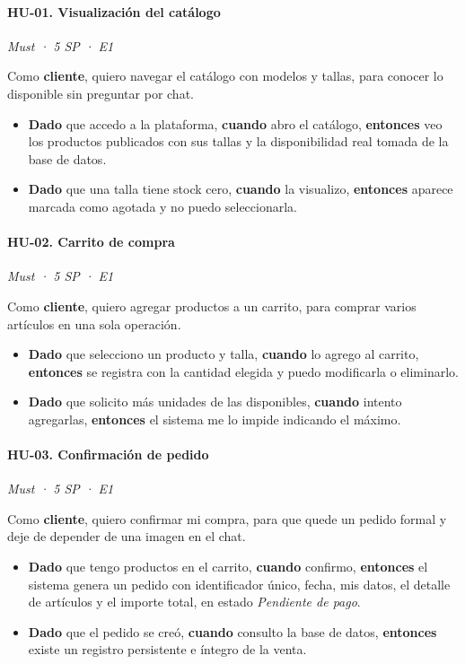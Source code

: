\documentclass[12pt, a4paper]{article}
\newcommand{\hutag}[3]{\textit{#1 · #2 · #3}\par\vspace{2pt}}
\begin{document}
\paragraph{HU-01. Visualización del catálogo}
\hutag{Must}{5 SP}{E1}
Como \textbf{cliente}, quiero navegar el catálogo con modelos y tallas, para conocer lo disponible sin preguntar por chat.
\begin{itemize}[leftmargin=*]
    \item \textbf{Dado} que accedo a la plataforma, \textbf{cuando} abro el catálogo, \textbf{entonces} veo los productos publicados con sus tallas y la disponibilidad real tomada de la base de datos.
    \item \textbf{Dado} que una talla tiene stock cero, \textbf{cuando} la visualizo, \textbf{entonces} aparece marcada como agotada y no puedo seleccionarla.
\end{itemize}

\paragraph{HU-02. Carrito de compra}
\hutag{Must}{5 SP}{E1}
Como \textbf{cliente}, quiero agregar productos a un carrito, para comprar varios artículos en una sola operación.
\begin{itemize}[leftmargin=*]
    \item \textbf{Dado} que selecciono un producto y talla, \textbf{cuando} lo agrego al carrito, \textbf{entonces} se registra con la cantidad elegida y puedo modificarla o eliminarlo.
    \item \textbf{Dado} que solicito más unidades de las disponibles, \textbf{cuando} intento agregarlas, \textbf{entonces} el sistema me lo impide indicando el máximo.
\end{itemize}

\paragraph{HU-03. Confirmación de pedido}
\hutag{Must}{5 SP}{E1}
Como \textbf{cliente}, quiero confirmar mi compra, para que quede un pedido formal y deje de depender de una imagen en el chat.
\begin{itemize}[leftmargin=*]
    \item \textbf{Dado} que tengo productos en el carrito, \textbf{cuando} confirmo, \textbf{entonces} el sistema genera un pedido con identificador único, fecha, mis datos, el detalle de artículos y el importe total, en estado \textit{Pendiente de pago}.
    \item \textbf{Dado} que el pedido se creó, \textbf{cuando} consulto la base de datos, \textbf{entonces} existe un registro persistente e íntegro de la venta.
\end{itemize}
\end{document}
